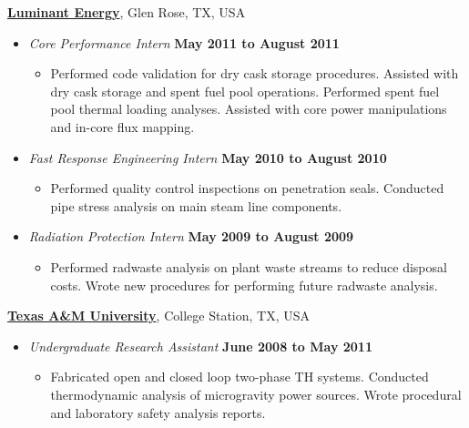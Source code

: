 \documentclass[10pt]{article}
\newenvironment{outerlist}[1][\enskip\textbullet]%
        {\begin{itemize}[#1,leftmargin=*]}{\end{itemize}%
         \vspace{-.6\baselineskip}}
\newenvironment{innerlist}[1][\enskip\textbullet]%
        {\begin{itemize}[#1,leftmargin=*,parsep=0pt,itemsep=0pt,topsep=0pt,partopsep=0pt]}
        {\end{itemize}}
\newcommand{\halfblankline}{\quad\vspace{-0.5\baselineskip}\pagebreak[3]}
\begin{document}
\halfblankline

\textbf{\href{https://www.luminant.com/}{Luminant Energy}},
Glen Rose, TX, USA
\begin{outerlist}

\item[] \textit{Core Performance Intern}%
        \hfill \textbf{May 2011 to August 2011}
\begin{innerlist}
\item[] Performed code validation for dry cask storage procedures. Assisted with dry cask storage and spent fuel pool operations. Performed spent fuel pool thermal loading analyses. Assisted with core power manipulations and in-core flux mapping.
\end{innerlist}

\item[] \textit{Fast Response Engineering Intern}%
        \hfill \textbf{May 2010 to August 2010}
\begin{innerlist}
\item[] Performed quality control inspections on penetration seals. Conducted pipe stress analysis on main steam line components.
\end{innerlist}

\item[] \textit{Radiation Protection Intern}%
        \hfill \textbf{May 2009 to August 2009}
\begin{innerlist}
\item[] Performed radwaste analysis on plant waste streams to reduce disposal costs. Wrote new procedures for performing future radwaste analysis.
\end{innerlist}

\end{outerlist}

\halfblankline

\textbf{\href{https://www.tamu.edu/}{Texas A\&M University}},
College Station, TX, USA
\begin{outerlist}

\item[] \textit{Undergraduate Research Assistant}%
        \hfill \textbf{June 2008 to May 2011}
\begin{innerlist}
\item[] Fabricated open and closed loop two-phase TH systems. Conducted thermodynamic analysis of microgravity power sources. Wrote procedural and laboratory safety analysis reports.
\end{innerlist}

\end{outerlist}
\end{document}
